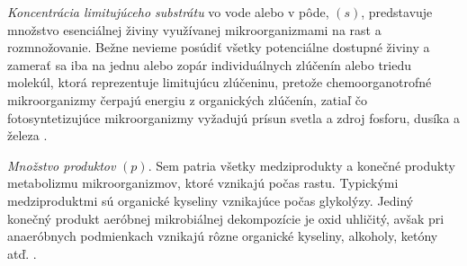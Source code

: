 \textit{Koncentrácia limitujúceho substrátu} vo vode alebo v pôde, $(s)$, predstavuje množstvo esenciálnej živiny využívanej mikroorganizmami na rast a rozmnožovanie. Bežne nevieme posúdiť všetky potenciálne dostupné živiny a zamerať sa iba na jednu alebo zopár individuálnych zlúčenín alebo triedu molekúl, ktorá reprezentuje limitujúcu zlúčeninu, pretože chemoorganotrofné mikroorganizmy čerpajú energiu z organických zlúčenín, zatiaľ čo fotosyntetizujúce mikroorganizmy vyžadujú prísun svetla a zdroj fosforu, dusíka a železa \cite{ref2}.

\textit{Množstvo produktov} $(p)$. Sem patria všetky medziprodukty a konečné produkty metabolizmu mikroorganizmov, ktoré vznikajú počas rastu. Typickými medziproduktmi sú organické kyseliny vznikajúce počas glykolýzy. Jediný konečný produkt aeróbnej mikrobiálnej dekompozície je oxid uhličitý, avšak pri anaeróbnych podmienkach vznikajú rôzne organické kyseliny, alkoholy, ketóny atď. \cite{ref2}.
